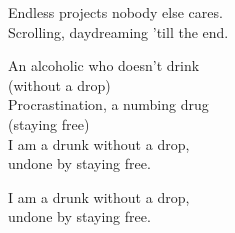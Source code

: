 \begin{lyrics}
Endless projects nobody else cares.\\
Scrolling, daydreaming 'till the end.

An alcoholic who doesn't drink\\
(without a drop)\\
Procrastination, a numbing drug\\
(staying free)\\
I am a drunk without a drop,\\
undone by staying free.


I am a drunk without a drop,\\
undone by staying free.


\end{lyrics}

